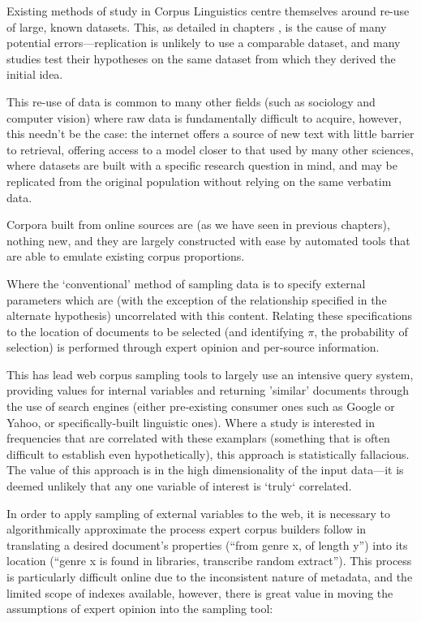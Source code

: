 

Existing methods of study in Corpus Linguistics centre themselves around re-use of large, known datasets.  This, as detailed in chapters , is the cause of many potential errors---replication is unlikely to use a comparable dataset, and many studies test their hypotheses on the same dataset from which they derived the initial idea.

This re-use of data is common to many other fields (such as sociology and computer vision) where raw data is fundamentally difficult to acquire, however, this needn't be the case: the internet offers a source of new text with little barrier to retrieval, offering access to a model closer to that used by many other sciences, where datasets are built with a specific research question in mind, and may be replicated from the original population without relying on the same verbatim data.

Corpora built from online sources are (as we have seen in previous chapters), nothing new, and they are largely constructed with ease by automated tools that are able to emulate existing corpus proportions.  

Where the `conventional' method of sampling data is to specify external parameters which are (with the exception of the relationship specified in the alternate hypothesis) uncorrelated with this content.  Relating these specifications to the location of documents to be selected (and identifying $\pi$, the probability of selection) is performed through expert opinion and per-source information.

This has lead web corpus sampling tools to largely use an intensive query system, providing values for internal variables and returning 'similar' documents through the use of search engines (either pre-existing consumer ones such as Google or Yahoo, or specifically-built linguistic ones).  Where a study is interested in frequencies that are correlated with these examplars (something that is often difficult to establish even hypothetically), this approach is statistically fallacious.  The value of this approach is in the high dimensionality of the input data---it is deemed unlikely that any one variable of interest is `truly` correlated.


In order to apply sampling of external variables to the web, it is necessary to algorithmically approximate the process expert corpus builders follow in translating a desired document's properties (``from genre x, of length y'') into its location (``genre x is found in libraries, transcribe random extract'').  This process is particularly difficult online due to the inconsistent nature of metadata, and the limited scope of indexes available, however, there is great value in moving the assumptions of expert opinion into the sampling tool:

